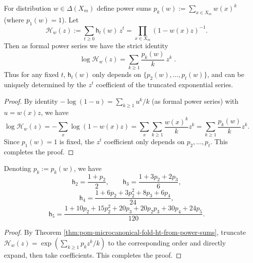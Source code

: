 \begin{theorem}\label{thm:pom-microcanonical-fold-ht-from-power-sums}
For distribution \(w\in\Delta(X_m)\) define power sums
\(
p_k(w):=\sum_{x\in X_m}w(x)^k
\)
(where \(p_1(w)=1\)).
Let
\[
\mathcal{H}_w(z):=\sum_{t\ge 0}\mathsf{h}_t(w)\,z^t=\prod_{x\in X_m}(1-w(x)z)^{-1}.
\]
Then as formal power series we have the strict identity
\[
\boxed{\;
\log \mathcal{H}_w(z)=\sum_{k\ge 1}\frac{p_k(w)}{k}\,z^k\; } .
\]
Thus for any fixed \(t\), \(\mathsf{h}_t(w)\) only depends on \(\{p_2(w),\dots,p_t(w)\}\), and can be uniquely determined by the \(z^t\) coefficient of the truncated exponential series.
\end{theorem}
\begin{proof}
By identity \(-\log(1-u)=\sum_{k\ge 1}u^k/k\) (as formal power series) with \(u=w(x)z\), we have
\[
\log \mathcal{H}_w(z)
=-\sum_{x}\log(1-w(x)z)
=\sum_{x}\sum_{k\ge 1}\frac{w(x)^k}{k}z^k
=\sum_{k\ge 1}\frac{p_k(w)}{k}z^k.
\]
Since \(p_1(w)=1\) is fixed, the \(z^t\) coefficient only depends on \(p_2,\dots,p_t\). This completes the proof.
\end{proof}

\begin{corollary}\label{cor:pom-microcanonical-fold-ht-low-order}
Denoting \(p_k:=p_k(w)\), we have
\[
\mathsf{h}_2=\frac{1+p_2}{2},\qquad
\mathsf{h}_3=\frac{1+3p_2+2p_3}{6},
\]
\[
\mathsf{h}_4=\frac{1+6p_2+3p_2^2+8p_3+6p_4}{24},
\]
\[
\mathsf{h}_5=\frac{1+10p_2+15p_2^2+20p_3+20p_2p_3+30p_4+24p_5}{120}.
\]
\end{corollary}
\begin{proof}
By Theorem \ref{thm:pom-microcanonical-fold-ht-from-power-sums}, truncate
\(
\mathcal{H}_w(z)=\exp(\sum_{k\ge 1}p_k z^k/k)
\)
to the corresponding order and directly expand, then take coefficients. This completes the proof.
\end{proof}

